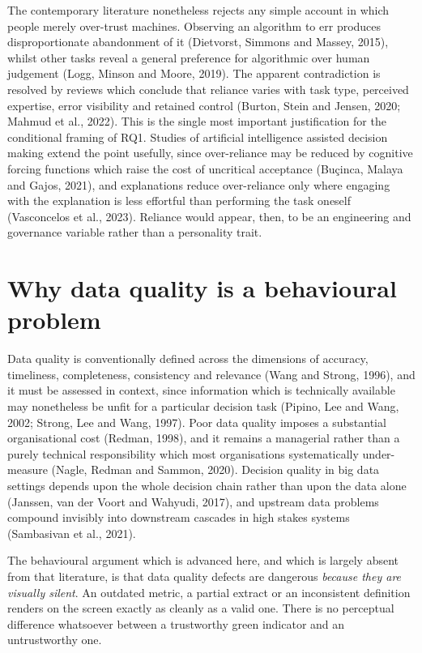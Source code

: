 \documentclass[12pt,a4paper]{article}
\begin{document}
The contemporary literature nonetheless rejects any simple account in which people merely
over-trust machines. Observing an algorithm to err produces disproportionate abandonment of it
(Dietvorst, Simmons and Massey, 2015), whilst other tasks reveal a general preference for
algorithmic over human judgement (Logg, Minson and Moore, 2019). The apparent contradiction is
resolved by reviews which conclude that reliance varies with task type, perceived expertise, error
visibility and retained control (Burton, Stein and Jensen, 2020; Mahmud et al., 2022). This is the
single most important justification for the conditional framing of RQ1. Studies of artificial
intelligence assisted decision making extend the point usefully, since over-reliance may be
reduced by cognitive forcing functions which raise the cost of uncritical acceptance (Buçinca,
Malaya and Gajos, 2021), and explanations reduce over-reliance only where engaging with the
explanation is less effortful than performing the task oneself (Vasconcelos et al., 2023).
Reliance would appear, then, to be an engineering and governance variable rather than a
personality trait.

\section{Why data quality is a behavioural problem}

Data quality is conventionally defined across the dimensions of accuracy, timeliness, completeness,
consistency and relevance (Wang and Strong, 1996), and it must be assessed in context, since information
which is technically available may nonetheless be unfit for a particular decision task (Pipino, Lee and
Wang, 2002; Strong, Lee and Wang, 1997). Poor data quality imposes a substantial organisational cost
(Redman, 1998), and it remains a managerial rather than a purely technical responsibility which most
organisations systematically under-measure (Nagle, Redman and Sammon, 2020). Decision quality in big data
settings depends upon the whole decision chain rather than upon the data alone (Janssen, van der Voort and
Wahyudi, 2017), and upstream data problems compound invisibly into downstream cascades in high stakes
systems (Sambasivan et al., 2021).

The behavioural argument which is advanced here, and which is largely absent from that literature, is that
data quality defects are dangerous \emph{because they are visually silent}. An outdated metric, a partial
extract or an inconsistent definition renders on the screen exactly as cleanly as a valid one. There is no
perceptual difference whatsoever between a trustworthy green indicator and an untrustworthy one.
\end{document}
